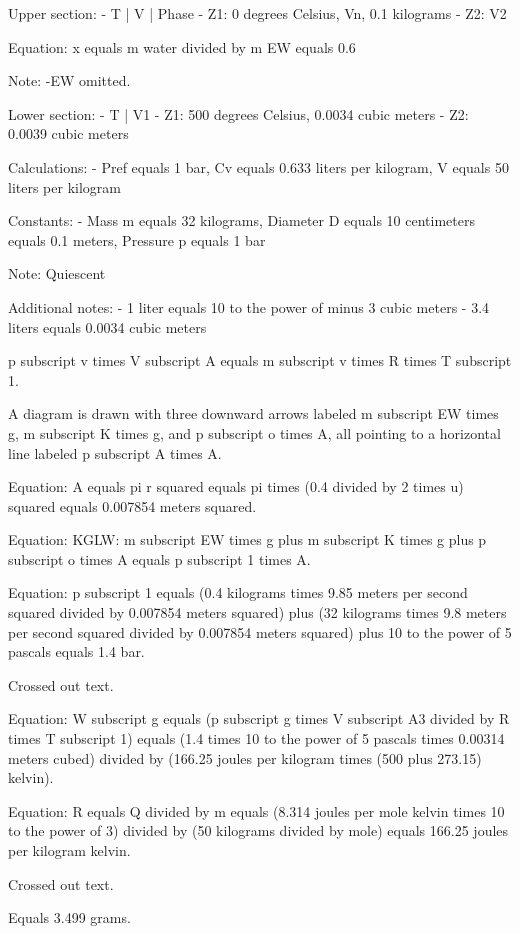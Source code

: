 Upper section:
- T | V | Phase
- Z1: 0 degrees Celsius, Vn, 0.1 kilograms
- Z2: V2

Equation: x equals m water divided by m EW equals 0.6

Note: -EW omitted.

Lower section:
- T | V1
- Z1: 500 degrees Celsius, 0.0034 cubic meters
- Z2: 0.0039 cubic meters

Calculations:
- Pref equals 1 bar, Cv equals 0.633 liters per kilogram, V equals 50 liters per kilogram

Constants:
- Mass m equals 32 kilograms, Diameter D equals 10 centimeters equals 0.1 meters, Pressure p equals 1 bar

Note: Quiescent

Additional notes:
- 1 liter equals 10 to the power of minus 3 cubic meters
- 3.4 liters equals 0.0034 cubic meters

p subscript v times V subscript A equals m subscript v times R times T subscript 1.

A diagram is drawn with three downward arrows labeled m subscript EW times g, m subscript K times g, and p subscript o times A, all pointing to a horizontal line labeled p subscript A times A.

Equation: A equals pi r squared equals pi times (0.4 divided by 2 times u) squared equals 0.007854 meters squared.

Equation: KGLW: m subscript EW times g plus m subscript K times g plus p subscript o times A equals p subscript 1 times A.

Equation: p subscript 1 equals (0.4 kilograms times 9.85 meters per second squared divided by 0.007854 meters squared) plus (32 kilograms times 9.8 meters per second squared divided by 0.007854 meters squared) plus 10 to the power of 5 pascals equals 1.4 bar.

Crossed out text.

Equation: W subscript g equals (p subscript g times V subscript A3 divided by R times T subscript 1) equals (1.4 times 10 to the power of 5 pascals times 0.00314 meters cubed) divided by (166.25 joules per kilogram times (500 plus 273.15) kelvin).

Equation: R equals Q divided by m equals (8.314 joules per mole kelvin times 10 to the power of 3) divided by (50 kilograms divided by mole) equals 166.25 joules per kilogram kelvin.

Crossed out text.

Equals 3.499 grams.